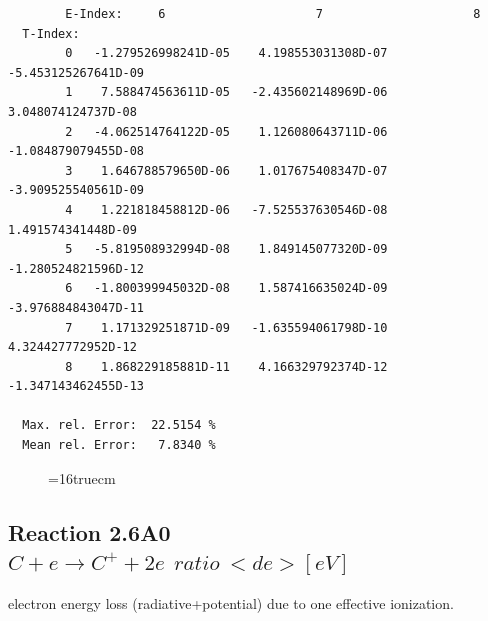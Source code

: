 \documentclass[12pt,dvips]{article}
\begin{document}
\begin{small}
\begin{verbatim}
        E-Index:     6                     7                     8
  T-Index:
        0   -1.279526998241D-05    4.198553031308D-07   -5.453125267641D-09
        1    7.588474563611D-05   -2.435602148969D-06    3.048074124737D-08
        2   -4.062514764122D-05    1.126080643711D-06   -1.084879079455D-08
        3    1.646788579650D-06    1.017675408347D-07   -3.909525540561D-09
        4    1.221818458812D-06   -7.525537630546D-08    1.491574341448D-09
        5   -5.819508932994D-08    1.849145077320D-09   -1.280524821596D-12
        6   -1.800399945032D-08    1.587416635024D-09   -3.976884843047D-11
        7    1.171329251871D-09   -1.635594061798D-10    4.324427772952D-12
        8    1.868229185881D-11    4.166329792374D-12   -1.347143462455D-13

  Max. rel. Error:  22.5154 %
  Mean rel. Error:   7.8340 %

\end{verbatim}\end{small}
\begin{figure} \label{2.3.13aec}
\epsfxsize=16truecm
\end{figure}
\newpage


\subsection{
  Reaction 2.6A0 $C  + e \rightarrow C^+   + 2e \ \  ratio ~ <de> [eV] $
}

  electron energy loss (radiative+potential) due to one effective ionization.
\end{document}

